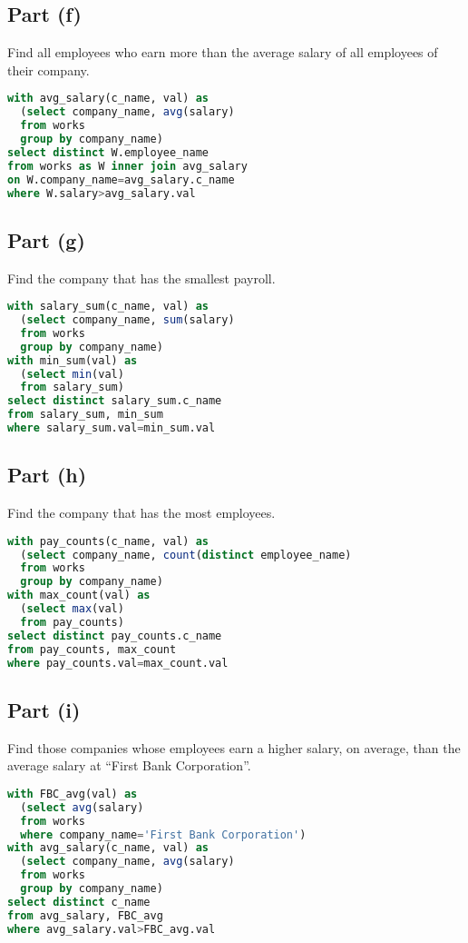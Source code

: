 \documentclass{article}
\begin{document}
\subsection{Part (f)}
Find all employees who earn more than the average salary of all employees of their company.
\begin{lstlisting}[language=sql]
with avg_salary(c_name, val) as
  (select company_name, avg(salary)
  from works
  group by company_name)
select distinct W.employee_name
from works as W inner join avg_salary
on W.company_name=avg_salary.c_name 
where W.salary>avg_salary.val
\end{lstlisting}

\subsection{Part (g)}
Find the company that has the smallest payroll.
\begin{lstlisting}[language=sql]
with salary_sum(c_name, val) as
  (select company_name, sum(salary)
  from works
  group by company_name)
with min_sum(val) as
  (select min(val)
  from salary_sum)
select distinct salary_sum.c_name
from salary_sum, min_sum
where salary_sum.val=min_sum.val
\end{lstlisting}

\newpage
\subsection{Part (h)}
Find the company that has the most employees.
\begin{lstlisting}[language=sql]
with pay_counts(c_name, val) as
  (select company_name, count(distinct employee_name)
  from works
  group by company_name)
with max_count(val) as
  (select max(val)
  from pay_counts)
select distinct pay_counts.c_name
from pay_counts, max_count
where pay_counts.val=max_count.val
\end{lstlisting}

\subsection{Part (i)}
Find those companies whose employees earn a higher salary, on average, than the average salary at
“First Bank Corporation”.
\begin{lstlisting}[language=sql]
with FBC_avg(val) as
  (select avg(salary)
  from works
  where company_name='First Bank Corporation')
with avg_salary(c_name, val) as
  (select company_name, avg(salary)
  from works
  group by company_name)
select distinct c_name
from avg_salary, FBC_avg
where avg_salary.val>FBC_avg.val
\end{lstlisting}
\end{document}
